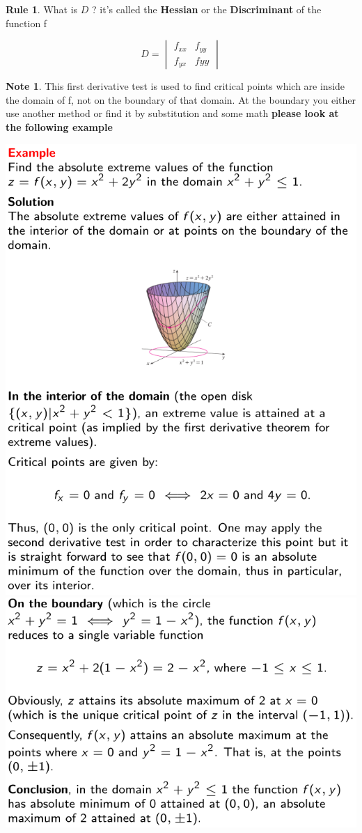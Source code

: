 \documentclass[11pt]{article}
\theoremstyle{definition}
\newtheorem{reg}{Rule}
\newtheorem{note}{Note}
\begin{document}
\begin{reg}
	What is $D$ ? it's called the \textbf{Hessian} or the \textbf{Discriminant} of the function f
\end{reg}
\begin{equation}
	D = \begin{vmatrix}
		f_{xx} & f_{yy} \\
		f_{yx} & f{yy}
	\end{vmatrix}
\end{equation}
\begin{note}
	This first derivative test is used to find critical points which are inside the domain of f, not on the boundary of that domain. At the boundary you either use another method or find it by substitution and some math \textbf{please look at the following example}
\end{note}
	\includegraphics[scale=0.4]{images/q1.png} 
	\includegraphics[scale=0.4]{images/q1-1.png}
\end{document}
